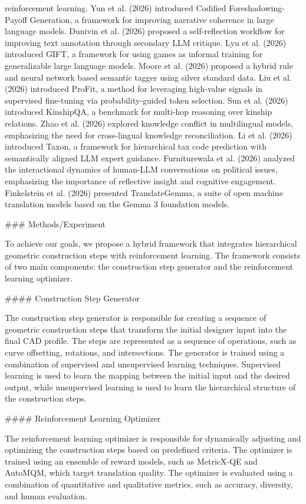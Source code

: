 reinforcement learning. Yun et al. (2026) introduced Codified Foreshadowing-Payoff Generation, a framework for improving narrative coherence in large language models. Dunivin et al. (2026) proposed a self-reflection workflow for improving text annotation through secondary LLM critique. Lyu et al. (2026) introduced GIFT, a framework for using games as informal training for generalizable large language models. Moore et al. (2026) proposed a hybrid rule and neural network based semantic tagger using silver standard data. Liu et al. (2026) introduced ProFit, a method for leveraging high-value signals in supervised fine-tuning via probability-guided token selection. Sun et al. (2026) introduced KinshipQA, a benchmark for multi-hop reasoning over kinship relations. Zhao et al. (2026) explored knowledge conflict in multilingual models, emphasizing the need for cross-lingual knowledge reconciliation. Li et al. (2026) introduced Taxon, a framework for hierarchical tax code prediction with semantically aligned LLM expert guidance. Furniturewala et al. (2026) analyzed the interactional dynamics of human-LLM conversations on political issues, emphasizing the importance of reflective insight and cognitive engagement. Finkelstein et al. (2026) presented TranslateGemma, a suite of open machine translation models based on the Gemma 3 foundation models.

### Methods/Experiment

To achieve our goals, we propose a hybrid framework that integrates hierarchical geometric construction steps with reinforcement learning. The framework consists of two main components: the construction step generator and the reinforcement learning optimizer.

#### Construction Step Generator

The construction step generator is responsible for creating a sequence of geometric construction steps that transform the initial designer input into the final CAD profile. The steps are represented as a sequence of operations, such as curve offsetting, rotations, and intersections. The generator is trained using a combination of supervised and unsupervised learning techniques. Supervised learning is used to learn the mapping between the initial input and the desired output, while unsupervised learning is used to learn the hierarchical structure of the construction steps.

#### Reinforcement Learning Optimizer

The reinforcement learning optimizer is responsible for dynamically adjusting and optimizing the construction steps based on predefined criteria. The optimizer is trained using an ensemble of reward models, such as MetricX-QE and AutoMQM, which target translation quality. The optimizer is evaluated using a combination of quantitative and qualitative metrics, such as accuracy, diversity, and human evaluation.

